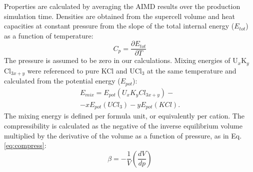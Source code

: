 \documentclass[preprint,3p,10pt,twocolumn,number,sort&compress]{elsarticle}
\begin{document}
Properties are calculated by averaging the AIMD results over the production simulation time. Densities are obtained from the supercell volume and heat capacities at constant pressure from the slope of the total internal energy ($E_{tot}$) as a function of temperature:
\begin{equation}
\label{eq:cp}
C_p=\frac{\partial E_{tot}}{\partial T}
\end{equation}
The pressure is assumed to be zero in our calculations. 
Mixing energies of U$_x$K$_y$Cl$_{3x+y}$ were referenced to pure KCl and UCl$_3$ at the same temperature and calculated from the potential energy ($E_{pot}$):
\begin{equation}
\begin{split}
E_{mix}=E_{pot}(U_xK_yCl_{3x+y})-\\
-xE_{pot}(UCl_3)-yE_{pot}(KCl).
\end{split}
\end{equation}
The mixing energy is defined per formula unit, or equivalently per cation. The compressibility is calculated as the negative of the inverse equilibrium volume multiplied by the derivative of the volume as a function of pressure, as in Eq. \ref{eq:compress}: 
\begin{equation} 
\label{eq:compress}
\beta = -\frac{1}{V} {\left(\frac{dV}{dp}\right)}
\end{equation}
\end{document}
